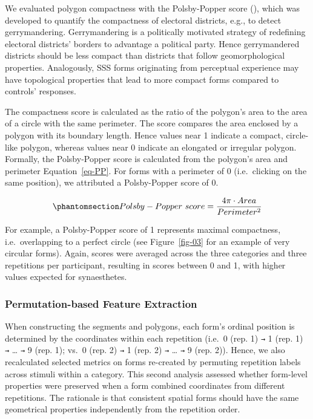 \documentclass[
  man,
  floatsintext,
  longtable,
  nolmodern,
  notxfonts,
  notimes,
  colorlinks=true,linkcolor=blue,citecolor=blue,urlcolor=blue]{apa7}
\begin{document}
We evaluated polygon compactness with the Polsby-Popper score
(), which was developed
to quantify the compactness of electoral districts, e.g., to detect
gerrymandering. Gerrymandering is a politically motivated strategy of
redefining electoral districts' borders to advantage a political party.
Hence gerrymandered districts should be less compact than districts that
follow geomorphological properties. Analogously, SSS forms originating
from perceptual experience may have topological properties that lead to
more compact forms compared to controls' responses.

The compactness score is calculated as the ratio of the polygon's area
to the area of a circle with the same perimeter. The score compares the
area enclosed by a polygon with its boundary length. Hence values near 1
indicate a compact, circle-like polygon, whereas values near 0 indicate
an elongated or irregular polygon. Formally, the Polsby-Popper score is
calculated from the polygon's area and perimeter Equation~\ref{eq-PP}.
For forms with a perimeter of 0 (i.e.~clicking on the same position), we
attributed a Polsby-Popper score of 0.

\begin{equation}\protect\phantomsection\label{eq-PP}{Polsby - Popper\ score = \frac{4\pi \cdot Area}{Perimeter^2}}\end{equation}

For example, a Polsby-Popper score of 1 represents maximal compactness,
i.e.~overlapping to a perfect circle (see Figure~\ref{fig-03} for an
example of very circular forms). Again, scores were averaged across the
three categories and three repetitions per participant, resulting in
scores between 0 and 1, with higher values expected for synaesthetes.

\subsubsection{Permutation-based Feature
Extraction}\label{sec-permutation-based-feature-extraction}

When constructing the segments and polygons, each form's ordinal
position is determined by the coordinates within each repetition (i.e.~0
(rep. 1) \texttt{→} 1 (rep. 1) \texttt{→} \ldots{} \texttt{→} 9 (rep.
1); vs.~0 (rep. 2) \texttt{→} 1 (rep. 2) \texttt{→} \ldots{} \texttt{→}
9 (rep. 2)). Hence, we also recalculated selected metrics on forms
re-created by permuting repetition labels across stimuli within a
category. This second analysis assessed whether form-level properties
were preserved when a form combined coordinates from different
repetitions. The rationale is that consistent spatial forms should have
the same geometrical properties independently from the repetition order.
\end{document}
